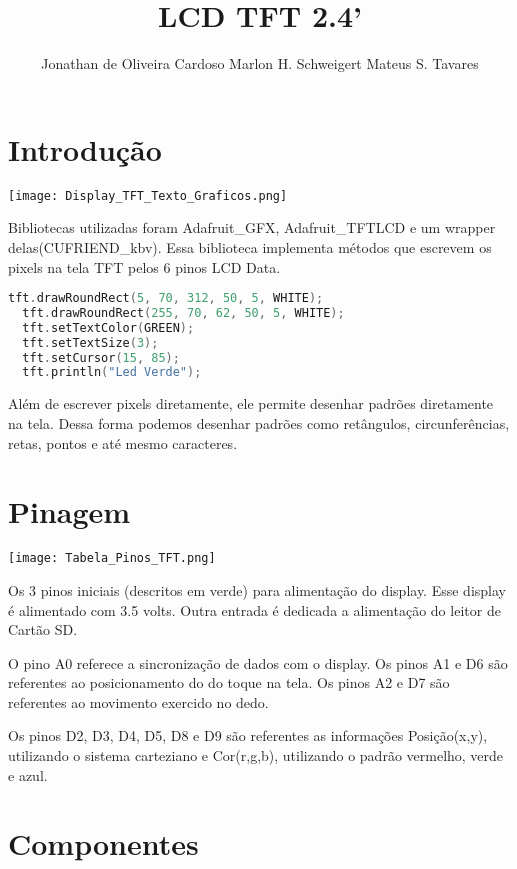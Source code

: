\documentclass[12pt]{article}
\title{LCD TFT 2.4'}
\author{Jonathan de Oliveira Cardoso\inst{1} Marlon H. Schweigert\inst{1} Mateus S. Tavares\inst{1}}
\begin{document}
\maketitle
\section{Introdução} \label{sec:relatorio}

\begin{center}
	\texttt{[image: Display\_TFT\_Texto\_Graficos.png]}
\end{center}

Bibliotecas utilizadas foram Adafruit\_GFX, Adafruit\_TFTLCD e um wrapper delas(CUFRIEND\_kbv).
Essa biblioteca implementa métodos que escrevem os pixels na tela TFT pelos 6 pinos LCD Data.

\begin{lstlisting}[language=c]
  tft.drawRoundRect(5, 70, 312, 50, 5, WHITE);
  tft.drawRoundRect(255, 70, 62, 50, 5, WHITE);
  tft.setTextColor(GREEN);
  tft.setTextSize(3);
  tft.setCursor(15, 85);
  tft.println("Led Verde");
\end{lstlisting}

Além de escrever pixels diretamente, ele permite desenhar padrões diretamente na tela.
Dessa forma podemos desenhar padrões como retângulos, circunferências, retas, pontos
e até mesmo caracteres.

\section{Pinagem} \label{sec:pin}

\begin{center}
	\texttt{[image: Tabela\_Pinos\_TFT.png]}
\end{center}

Os 3 pinos iniciais (descritos em verde) para alimentação do display. Esse display é alimentado com 3.5 volts. Outra entrada é dedicada a alimentação do leitor de Cartão SD.

O pino A0 referece a sincronização de dados com o display.
Os pinos A1 e D6 são referentes ao posicionamento do do toque na tela.
Os pinos A2 e D7 são referentes ao movimento exercido no dedo.

Os pinos D2, D3, D4, D5, D8 e D9 são referentes as informações Posição(x,y), utilizando o sistema carteziano e Cor(r,g,b), utilizando o padrão vermelho, verde e azul.

\section{Componentes} \label{sec:comp}
\end{document}
